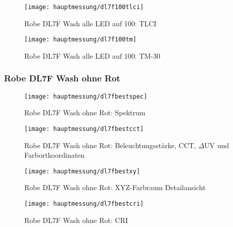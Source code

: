 \documentclass[pagesize,paper=A4,fontsize=12pt,utf8,numbers=noenddot,bibliography=totoc,listof=totoc,DIV=11,BCOR=1mm]{scrreprt}
\begin{document}
\begin{figure}[htp]     %
\centering
\texttt{[image: hauptmessung/dl7f100tlci]} 
\caption { Robe DL7F Wash alle LED auf 100: TLCI} 
\end{figure}

\begin{figure}[htp]     %
\centering
\texttt{[image: hauptmessung/dl7f100tm]} 
\caption { Robe DL7F Wash alle LED auf 100: TM-30} 
\end{figure}

\subsubsection{ Robe DL7F Wash ohne Rot}

\begin{figure}[htp]     %
\centering
\texttt{[image: hauptmessung/dl7fbestspec]} 
\caption { Robe DL7F Wash ohne Rot: Spektrum} 
\end{figure}

\begin{figure}[htp]     %
\centering
\texttt{[image: hauptmessung/dl7fbestcct]} 
\caption { Robe DL7F Wash ohne Rot: Beleuchtungsstärke, CCT, $\Delta$UV und Farbortkoordinaten} 
\end{figure}

\begin{figure}[htp]     %
\centering
\texttt{[image: hauptmessung/dl7fbestxy]} 
\caption { Robe DL7F Wash ohne Rot: XYZ-Farbraum Detailansicht} 
\end{figure}

\begin{figure}[htp]     %
\centering
\texttt{[image: hauptmessung/dl7fbestcri]} 
\caption { Robe DL7F Wash ohne Rot: CRI} 
\end{figure}
\end{document}

